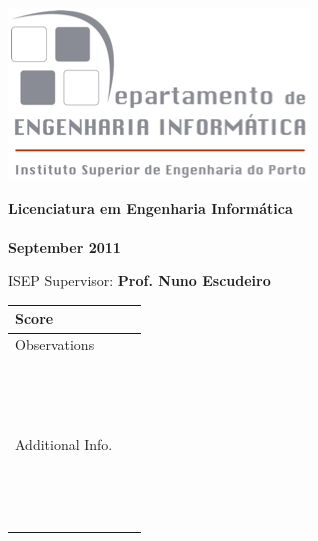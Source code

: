 	\vfill
	\begin{center}
		\includegraphics{img/logoisep2.png}\\
	\end{center}
	
	\vfill
	\begin{center}
		\bf \Large Licenciatura em Engenharia Informática\\
		\ \\ \normalsize September 2011
	\end{center}
	
	\vfill
	\begin{center}
		ISEP Supervisor: \bf Prof. Nuno Escudeiro
	\end{center}
	
\newpage
\vfill
\begin{flushright}
	\begin{tabular}{|l| p{200px} |}
	\hline
	Score & ~\\
	\hline
	Observations & ~\\
	~ & ~ \\
	~ & ~ \\
	~ & ~ \\
	\hline
	Additional Info. & ~\\
	~ & ~ \\
	~ & ~ \\
	~ & ~ \\
	\hline
	\end{tabular}
\end{flushright}